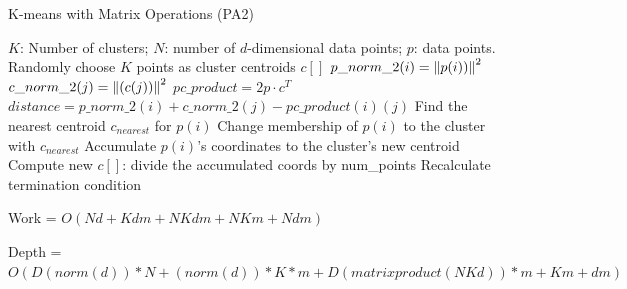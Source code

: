 \documentclass[
nopagebreaks,
style=klope,
fleqn]{powerdot}
\begin{document}
\begin{slide}{K-means with Matrix Operations (PA2)}
  \tiny
  \begin{algorithmic}[1] 
    \INPUT $K$: Number of clusters; $N$: number of $d$-dimensional data points; $p$: data points.
     \label{alg:pm}
    \State Randomly choose $K$ points as cluster centroids $c[]$
    \State $p\_norm\_2(i) = \left\lVert p(i))\right\rVert^2$
    \EndFor
    \State $c\_norm\_2(j) = \left\lVert(c(j))\right\rVert^2$
    \EndFor
    \State $pc\_product = 2 p \cdot c^T$
    \State $distance = p\_norm\_2(i) + c\_norm\_2(j) - pc\_product(i)(j)$
    \EndFor
    \State Find the nearest centroid $c_{nearest}$ for $p(i)$
    \State Change membership of $p(i)$ to the cluster with $c_{nearest}$
    \State Accumulate $p(i)$'s coordinates to the cluster's new centroid
    \EndParFor
    \State Compute new $c[]$: divide the accumulated coords by num\_points
    \State Recalculate termination condition
    \EndWhile
    \EndFunction
  \end{algorithmic}
  \vspace{.3cm}
  \tiny
  \begin{compactitem}
  \item{Work = $O(Nd + Kdm + NKdm + NKm + Ndm)$}
  \item{Depth = $O(D(norm(d))*N + (norm(d))*K*m + D(matrix product(NKd))*m + Km + dm)$}
  \end{compactitem}
\end{slide}
\end{document}
